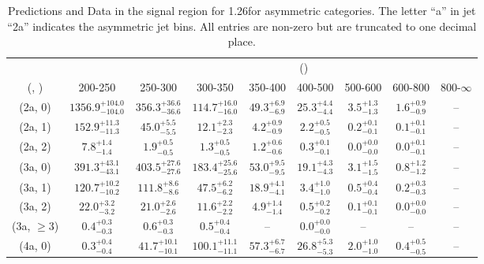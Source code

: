 \begin{table}[h!]
\tiny
\centering
\caption{Predictions and Data in the signal region for 1.26\ifb for asymmetric categories. The letter ``a'' in jet \eg ``2a''  indicates the asymmetric jet bins. All entries are non-zero but are truncated to one decimal place.\label{tab:yieldsseppost_sig_ttw_asym}}
\begin{tabular}
{ccccccccc}
	\hline\hline
&	& \multicolumn{8}{c}{\scalht (\gev)} \\ 
	 (\njet,  \nb) & 200-250 & 250-300 & 300-350 & 350-400 & 400-500 & 500-600 & 600-800 & 800-$\infty$ \\ [0.8ex] 
\hline
	(2a, 0) & $1356.9^{+ 104.0 }_{- 104.0 }$ & $356.3^{+ 36.6 }_{- 36.6 }$ & $114.7^{+ 16.0 }_{- 16.0 }$ & $49.3^{+ 6.9 }_{- 6.9 }$ & $25.3^{+ 4.4 }_{- 4.4 }$ & $3.5^{+ 1.3 }_{- 1.3 }$ & $1.6^{+ 0.9 }_{- 0.9 }$ & -- \\[0.5ex] 
	(2a, 1) & $152.9^{+ 11.3 }_{- 11.3 }$ & $45.0^{+ 5.5 }_{- 5.5 }$ & $12.1^{+ 2.3 }_{- 2.3 }$ & $4.2^{+ 0.9 }_{- 0.9 }$ & $2.2^{+ 0.5 }_{- 0.5 }$ & $0.2^{+ 0.1 }_{- 0.1 }$ & $0.1^{+ 0.1 }_{- 0.1 }$ & -- \\[0.5ex] 
	(2a, 2) & $7.8^{+ 1.4 }_{- 1.4 }$ & $1.9^{+ 0.5 }_{- 0.5 }$ & $1.3^{+ 0.5 }_{- 0.5 }$ & $1.2^{+ 0.6 }_{- 0.6 }$ & $0.3^{+ 0.1 }_{- 0.1 }$ & $0.0^{+ 0.0 }_{- 0.0 }$ & $0.0^{+ 0.1 }_{- 0.1 }$ & -- \\[0.5ex] 
	(3a, 0) & $391.3^{+ 43.1 }_{- 43.1 }$ & $403.5^{+ 27.6 }_{- 27.6 }$ & $183.4^{+ 25.6 }_{- 25.6 }$ & $53.0^{+ 9.5 }_{- 9.5 }$ & $19.1^{+ 4.3 }_{- 4.3 }$ & $3.1^{+ 1.5 }_{- 1.5 }$ & $0.8^{+ 1.2 }_{- 1.2 }$ & -- \\[0.5ex] 
	(3a, 1) & $120.7^{+ 10.2 }_{- 10.2 }$ & $111.8^{+ 8.6 }_{- 8.6 }$ & $47.5^{+ 6.2 }_{- 6.2 }$ & $18.9^{+ 4.1 }_{- 4.1 }$ & $3.4^{+ 1.0 }_{- 1.0 }$ & $0.5^{+ 0.4 }_{- 0.4 }$ & $0.2^{+ 0.3 }_{- 0.3 }$ & -- \\[0.5ex] 
	(3a, 2) & $22.0^{+ 3.2 }_{- 3.2 }$ & $21.0^{+ 2.6 }_{- 2.6 }$ & $11.6^{+ 2.2 }_{- 2.2 }$ & $4.9^{+ 1.4 }_{- 1.4 }$ & $0.5^{+ 0.2 }_{- 0.2 }$ & $0.1^{+ 0.1 }_{- 0.1 }$ & $0.0^{+ 0.0 }_{- 0.0 }$ & -- \\[0.5ex] 
	(3a, $\ge3$) & $0.4^{+ 0.3 }_{- 0.3 }$ & $0.6^{+ 0.3 }_{- 0.3 }$ & $0.5^{+ 0.4 }_{- 0.4 }$ & -- & $0.0^{+ 0.0 }_{- 0.0 }$ & -- & -- & -- \\[0.5ex] 
	(4a, 0) & $0.3^{+ 0.4 }_{- 0.4 }$ & $41.7^{+ 10.1 }_{- 10.1 }$ & $100.1^{+ 11.1 }_{- 11.1 }$ & $57.3^{+ 6.7 }_{- 6.7 }$ & $26.8^{+ 5.3 }_{- 5.3 }$ & $2.0^{+ 1.0 }_{- 1.0 }$ & $0.4^{+ 0.5 }_{- 0.5 }$ & -- \\[0.5ex] 

\end{tabular}
\end{table}
